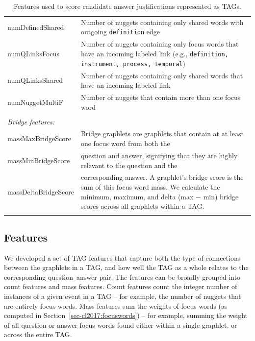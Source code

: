 \begin{table}[]
{\begin{tabular}{p{35mm}p{105mm}}
numDefinedShared	&	Number of nuggets containing only shared words with outgoing {\tt definition} edge \\
numQLinksFocus		&	Number of nuggets containing only focus words that have an incoming labeled link (e.g., {\tt definition, instrument, process, temporal})  \\
numQLinksShared		&	Number of nuggets containing only shared words that have an incoming labeled link  \\
numNuggetMultiF		&	Number of nuggets that contain more than one focus word\\
\\
\multicolumn{2}{l}{\emph{Bridge features:}} \\
massMaxBridgeScore		&	Bridge graphlets are graphlets that contain at at least one focus word from both the  \\
massMinBridgeScore		&	question and answer, signifying that they are highly relevant to the question and the \\
massDeltaBridgeScore	&	corresponding answer. A   graphlet's bridge score is the sum of this focus word mass.  We calculate the minimum, maximum, and delta (max $-$ min) bridge scores across all graphlets within a TAG. \\
\\
\hline
\end{tabular}
}
\caption{{  Features used to score candidate answer justifications represented as TAGs. }} 
\label{tab:features}
\end{table}


\subsection {Features} 
\label{sec-cl2017:featuresandscoring}

We developed a set of TAG features that capture both the type of connections between the graphlets in a TAG, and how well the TAG as a whole relates to the corresponding question--answer pair.
The features can be broadly grouped into count features and mass features. Count features count the integer number of instances of a given event in a TAG -- for example, the number of nuggets that are entirely focus words.  Mass features sum the weights of focus words (as computed in Section~\ref{sec-cl2017:focuswords}) -- for example, summing the weight of all question or answer focus words found either within a single graphlet, or across the entire TAG.

